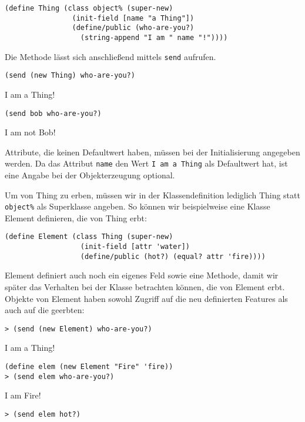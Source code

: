 \begin{lstlisting}
(define Thing (class object% (super-new)
                (init-field [name "a Thing"])
                (define/public (who-are-you?) 
                  (string-append "I am " name "!"))))
\end{lstlisting}

Die Methode lässt sich anschließend mittels \texttt{send} aufrufen.

\begin{lstlisting}
(send (new Thing) who-are-you?)
\end{lstlisting}
{\routput {\qq}I am a Thing!{\qq}}

\begin{lstlisting}
(send bob who-are-you?)
\end{lstlisting}
{\routput {\qq}I am not Bob!{\qq}}

Attribute, die keinen Defaultwert haben, müssen bei der Initialisierung angegeben werden. Da das Attribut \texttt{name} den Wert  \texttt{{\qq}I am a Thing{\qq}} als Defaultwert hat, ist eine Angabe bei der Objekterzeugung optional. 

Um von Thing zu erben, müssen wir in der Klassendefinition lediglich Thing statt \texttt{object\%} als Superklasse angeben. So können wir beispielweise eine Klasse Element definieren, die von Thing erbt:

\begin{lstlisting}
(define Element (class Thing (super-new)
                  (init-field [attr 'water])
                  (define/public (hot?) (equal? attr 'fire))))
\end{lstlisting}

Element definiert auch noch ein eigenes Feld sowie eine Methode, damit wir später das Verhalten bei der Klasse betrachten können, die von Element erbt. Objekte von Element haben sowohl Zugriff auf die neu definierten Features als auch auf die geerbten:

\begin{lstlisting}
> (send (new Element) who-are-you?)
\end{lstlisting}
{\routput {\qq}I am a Thing!\qq}

\begin{lstlisting}
(define elem (new Element "Fire" 'fire))
> (send elem who-are-you?)
\end{lstlisting} 
{\routput {\qq}I am Fire!\qq}
\begin{lstlisting}
> (send elem hot?)
\end{lstlisting} 
{}

